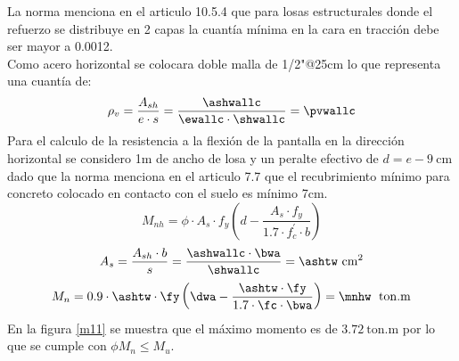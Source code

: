 \newpage
\noindent
La norma \cite{E-060} menciona en el articulo 10.5.4 que para losas estructurales donde el refuerzo se distribuye en 2 capas la cuantía mínima en la cara en tracción debe ser mayor a 0.0012.\\
Como acero horizontal se colocara doble malla de 1/2"@25cm lo que representa una cuantía de:
\FPset{}
\FPset{}
\FPset{}
\FPset{}
\FPeval{}
\FPset{}
\FPeval{}
\FPeval{}
\begin{align*}
\rho_{v} =\frac{A_{sh}}{e\cdot s}=\frac{\ashwallc}{\ewallc\cdot \shwallc}=\pvwallc
\end{align*}
\noindent Para el calculo de la resistencia a la flexión de la pantalla en la dirección horizontal se considero 1m de ancho de losa y un peralte efectivo de $d=e-9\mathrm{~cm}$ dado que la norma \cite{E-060} menciona en el articulo 7.7 que el recubrimiento mínimo para concreto colocado en contacto con el suelo es mínimo 7cm.
$$
M_{nh}=\phi\cdot A_{s}\cdot f_{y}\left ( d-\frac{A_{s}\cdot f_{y}}{1.7\cdot f_{c}^{'}\cdot b} \right )$$
$$
A_{s}=\frac{A_{sh}\cdot b}{s}=\frac{\ashwallc\cdot\bwa}{\shwallc}=\ashtw\mathrm{~cm^2}$$
$$
M_{n}=0.9\cdot \ashtw \cdot \fy\left ( \dwa-\frac{\ashtw\cdot \fy}{1.7\cdot\fc \cdot \bwa} \right )=\mnhw\;\mathrm{~ton.m} 
$$
En la figura \ref{m11} se muestra que el máximo momento es de $3.72\mathrm{~ton.m}$ por lo que se cumple con $\phi M_{n}\leq M_{u}$.

